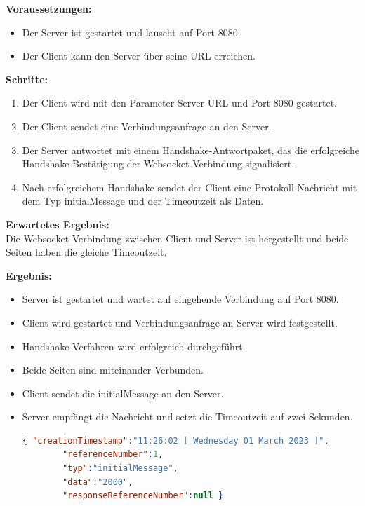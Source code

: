 \documentclass[thesis.tex]{subfiles}
\begin{document}
\textbf{Voraussetzungen:}
\begin{itemize}
    \item Der Server ist gestartet und lauscht auf Port 8080.
    \item Der Client kann den Server über seine URL erreichen.
\end{itemize}

\textbf{Schritte:}
\begin{enumerate}
    \item Der Client wird mit den Parameter Server-URL und Port 8080 gestartet.
    \item Der Client sendet eine Verbindungsanfrage an den Server.
    \item Der Server antwortet mit einem Handshake-Antwortpaket, das die erfolgreiche\\ Handshake-Bestätigung der Websocket-Verbindung signalisiert.
    \item Nach erfolgreichem Handshake sendet der Client eine Protokoll-Nachricht mit dem Typ \glqq initialMessage\grqq{} und der Timeoutzeit als Daten.
\end{enumerate}

\textbf{Erwartetes Ergebnis:}\\
Die Websocket-Verbindung zwischen Client und Server ist hergestellt und beide Seiten haben die gleiche Timeoutzeit.

\textbf{Ergebnis:}
\begin{itemize}
    \item Server ist gestartet und wartet auf eingehende Verbindung auf Port 8080.
    \item Client wird gestartet und Verbindungsanfrage an Server wird festgestellt.
    \item Handshake-Verfahren wird erfolgreich durchgeführt.
    \item Beide Seiten sind miteinander Verbunden.
    \item Client sendet die \glqq initialMessage\grqq{} an den Server.
    \item Server empfängt die Nachricht und setzt die Timeoutzeit auf zwei Sekunden.
    \begin{lstlisting}[caption={Beispiel einer Protokollnachricht vom Typ initialMessage},captionpos=b,language=json,firstnumber=1]
        { "creationTimestamp":"11:26:02 [ Wednesday 01 March 2023 ]",
        "referenceNumber":1,
        "typ":"initialMessage",
        "data":"2000",
        "responseReferenceNumber":null }
    \end{lstlisting}
\end{itemize}
\end{document}
